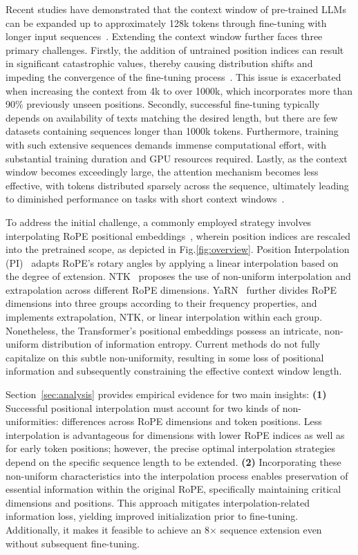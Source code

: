 Recent studies have demonstrated that the context window of pre-trained LLMs can be expanded up to approximately 128k tokens through fine-tuning with longer input sequences~\cite{longlora,pi,yarn,zhang2024soaring,liu2023scaling}. Extending the context window further faces three primary challenges. Firstly, the addition of untrained position indices can result in significant catastrophic values, thereby causing distribution shifts and impeding the convergence of the fine-tuning process~\cite{pi}. This issue is exacerbated when increasing the context from 4k to over 1000k, which incorporates more than 90\% previously unseen positions. Secondly, successful fine-tuning typically depends on availability of texts matching the desired length, but there are few datasets containing sequences longer than 1000k tokens. Furthermore, training with such extensive sequences demands immense computational effort, with substantial training duration and GPU resources required. Lastly, as the context window becomes exceedingly large, the attention mechanism becomes less effective, with tokens distributed sparsely across the sequence, ultimately leading to diminished performance on tasks with short context windows~\cite{pi}.

To address the initial challenge, a commonly employed strategy involves interpolating RoPE positional embeddings~\cite{rope,pi}, wherein position indices are rescaled into the pretrained scope, as depicted in Fig.\ref{fig:overview}. Position Interpolation (PI)~\cite{pi} adapts RoPE’s rotary angles by applying a linear interpolation based on the degree of extension. NTK~\cite{ntk,dynamicntk} proposes the use of non-uniform interpolation and extrapolation across different RoPE dimensions. YaRN~\cite{yarn} further divides RoPE dimensions into three groups according to their frequency properties, and implements extrapolation, NTK, or linear interpolation within each group. Nonetheless, the Transformer’s positional embeddings possess an intricate, non-uniform distribution of information entropy. Current methods do not fully capitalize on this subtle non-uniformity, resulting in some loss of positional information and subsequently constraining the effective context window length.

Section~\ref{sec:analysis} provides empirical evidence for two main insights: \textbf{(1)} Successful positional interpolation must account for two kinds of non-uniformities: differences across RoPE dimensions and token positions. Less interpolation is advantageous for dimensions with lower RoPE indices as well as for early token positions; however, the precise optimal interpolation strategies depend on the specific sequence length to be extended.
\textbf{(2)} Incorporating these non-uniform characteristics into the interpolation process enables preservation of essential information within the original RoPE, specifically maintaining critical dimensions and positions. This approach mitigates interpolation-related information loss, yielding improved initialization prior to fine-tuning. Additionally, it makes it feasible to achieve an 8$\times$ sequence extension even without subsequent fine-tuning.

